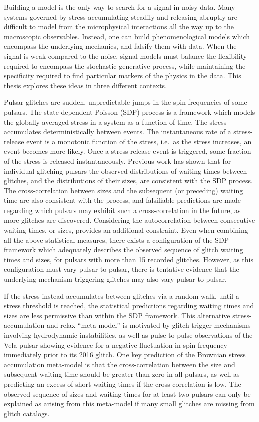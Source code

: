 Building a model is the only way to search for a signal in noisy data. Many systems governed by stress accumulating steadily and releasing abruptly are difficult to model from the microphysical interactions all the way up to the macroscopic observables. Instead, one can build phenomenological models which encompass the underlying mechanics, and falsify them with data. When the signal is weak compared to the noise, signal models must balance the flexibility required to encompass the stochastic generative process, while maintaining the specificity required to find particular markers of the physics in the data. This thesis explores these ideas in three different contexts. 

Pulsar glitches are sudden, unpredictable jumps in the spin frequencies of some pulsars. The state-dependent Poisson (SDP) process is a framework which models the globally averaged stress in a system as a function of time. The stress accumulates deterministically between events. The instantaneous rate of a stress-release event is a monotonic function of the stress, i.e.~as the stress increases, an event becomes more likely. Once a stress-release event is triggered, some fraction of the stress is released instantaneously. Previous work has shown that for individual glitching pulsars the observed distributions of waiting times between glitches, and the distributions of their sizes, are consistent with the SDP process. The cross-correlation between sizes and the subsequent (or preceding) waiting time are also consistent with the process, and falsifiable predictions are made regarding which pulsars may exhibit such a cross-correlation in the future, as more glitches are discovered. Considering the autocorrelation between consecutive waiting times, or sizes, provides an additional constraint. Even when combining all the above statistical measures, there exists a configuration of the SDP framework which adequately describes the observed sequence of glitch waiting times and sizes, for pulsars with more than 15 recorded glitches. However, as this configuration must vary pulsar-to-pulsar, there is tentative evidence that the underlying mechanism triggering glitches may also vary pulsar-to-pulsar.

If the stress instead accumulates between glitches via a random walk, until a stress threshold is reached, the statistical predictions regarding waiting times and sizes are less permissive than within the SDP framework. This alternative stress-accumulation and relax ``meta-model'' is motivated by glitch trigger mechanisms involving hydrodynamic instabilities, as well as pulse-to-pulse observations of the Vela pulsar showing evidence for a negative fluctuation in spin frequency immediately prior to its 2016 glitch. One key prediction of the Brownian stress accumulation meta-model is that the cross-correlation between the size and subsequent waiting time should be greater than zero in all pulsars, as well as predicting an excess of short waiting times if the cross-correlation is low. The observed sequence of sizes and waiting times for at least two pulsars can only be explained as arising from this meta-model if many small glitches are missing from glitch catalogs.  

